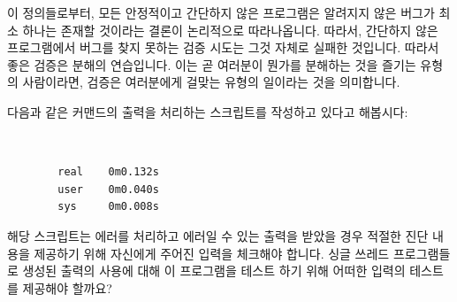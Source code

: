 이 정의들로부터, 모든 안정적이고 간단하지 않은 프로그램은 알려지지 않은 버그가
최소 하나는 존재할 것이라는 결론이 논리적으로 따라나옵니다.
따라서, 간단하지 않은 프로그램에서 버그를 찾지 못하는 검증 시도는 그것 자체로
실패한 것입니다.
따라서 좋은 검증은 분해의 연습입니다.
이는 곧 여러분이 뭔가를 분해하는 것을 즐기는 유형의 사람이라면, 검증은
여러분에게 걸맞는 유형의 일이라는 것을 의미합니다.

\QuickQuiz{}
	다음과 같은  커맨드의 출력을 처리하는 스크립트를 작성하고
	있다고 해봅시다:

	\vspace{5pt}
	\begin{minipage}[t]{\columnwidth}
	\tt
	\scriptsize
	\begin{verbatim}
		real    0m0.132s
		user    0m0.040s
		sys     0m0.008s
	\end{verbatim}
	\end{minipage}
	\vspace{5pt}

	해당 스크립트는 에러를 처리하고 에러일 수 있는  출력을 받았을
	경우 적절한 진단 내용을 제공하기 위해 자신에게 주어진 입력을 체크해야
	합니다.
	싱글 쓰레드 프로그램들로 생성된  출력의 사용에 대해 이
	프로그램을 테스트 하기 위해 어떠한 입력의 테스트를 제공해야 할까요?
	\iffalse

